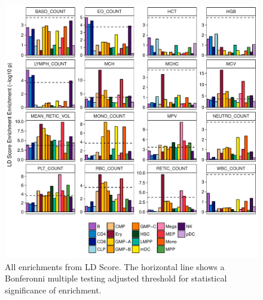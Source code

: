 \documentclass{article}\usepackage[]{graphicx}\usepackage[]{color}
\makeatletter
\def\maxwidth{ %
  \ifdim\Gin@nat@width>\linewidth
    \linewidth
  \else
    \Gin@nat@width
  \fi
}
\newenvironment{knitrout}{}{} %
\makeatother
\begin{document}
\begin{enumerate}[label=(\Alph*)]
\begin{knitrout}
\begin{figure}[H]
{\centering \includegraphics[width=\maxwidth]{figure/allLDscore-1} 

}

\caption[All enrichments from LD Score]{All enrichments from LD Score. The horizontal line shows a Bonferonni multiple testing adjusted threshold for statistical significance of enrichment.}\label{fig:allLDscore}
\end{figure}


\end{knitrout}

\begin{knitrout}
\color{fgcolor}\begin{figure}[H]


\end{figure}
\end{knitrout}
\end{enumerate}
\end{document}
